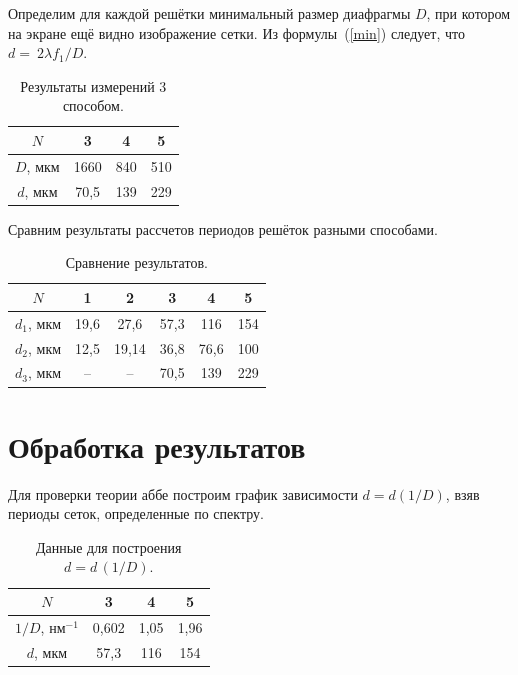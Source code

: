\documentclass[a4paper,12pt]{article} %
\begin{document}
	Определим для каждой решётки минимальный размер диафрагмы $D$, при котором на экране ещё видно изображение сетки. Из формулы~(\ref{min}) следует, что $d =~2\lambda f_1 / D$.

	\begin{table}[H]
		\caption{Результаты измерений 3 способом.}
		\label{table:exp3}
		\begin{tabular}{|c|c|c|c|}
			\hline
			$N$      & 3    & 4   & 5   \\ \hline
			$D$, мкм & 1660 & 840 & 510 \\ \hline
			$d$, мкм & 70,5 & 139 & 229 \\ \hline
		\end{tabular}
	\end{table}

	
	Сравним результаты рассчетов периодов решёток разными способами.
	
	\begin{table}[H]
		\caption{Сравнение результатов.}
		\label{table:compare}
		\begin{tabular}{|c|c|c|c|c|c|}
			\hline
			$N$        & 1    & 2     & 3    & 4    & 5   \\ \hline
			$d_1$, мкм & 19,6 & 27,6  & 57,3 & 116  & 154 \\ \hline
			$d_2$, мкм & 12,5 & 19,14 & 36,8 & 76,6 & 100 \\ \hline
			$d_3$, мкм & --   & --    & 70,5 & 139  & 229 \\ \hline
		\end{tabular}
	\end{table}
		
		
\newpage
\section {Обработка результатов}
	Для проверки теории аббе построим график зависимости $d = d(1/D)$, взяв периоды сеток, определенные по спектру.
	
	\begin{table}[H]
		\caption{Данные для построения $d=d\,(1/D)$.}
		\label{table:d=d(1/D)}
		\begin{tabular}{|c|c|c|c|}
			\hline
			$N$              & 3     & 4    & 5    \\ \hline
			$1/D$, нм$^{-1}$ & 0,602 & 1,05 & 1,96 \\ \hline
			$d$, мкм         & 57,3  & 116  & 154  \\ \hline
		\end{tabular}
	\end{table}
	
\end{document}
